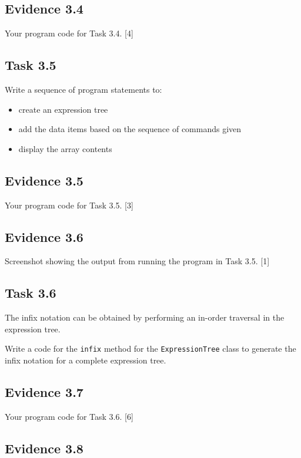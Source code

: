 \subsection*{Evidence 3.4 }

Your program code for Task 3.4. \hfill{} {[}4{]}

\subsection*{Task 3.5 }

Write a sequence of program statements to: 
\begin{itemize}
\item create an expression tree
\item add the data items based on the sequence of commands given 
\item display the array contents 
\end{itemize}

\subsection*{Evidence 3.5 }

Your program code for Task 3.5. \hfill{}{[}3{]}

\subsection*{Evidence 3.6 }

Screenshot showing the output from running the program in Task 3.5.
\hfill{}{[}1{]}

\subsection*{Task 3.6 }

The infix notation can be obtained by performing an in-order traversal
in the expression tree. 

Write a code for the \texttt{infix} method for the \texttt{ExpressionTree}
class to generate the infix notation for a complete expression tree. 

\subsection*{Evidence 3.7 }

Your program code for Task 3.6. \hfill{} {[}6{]}

\subsection*{Evidence 3.8 }

